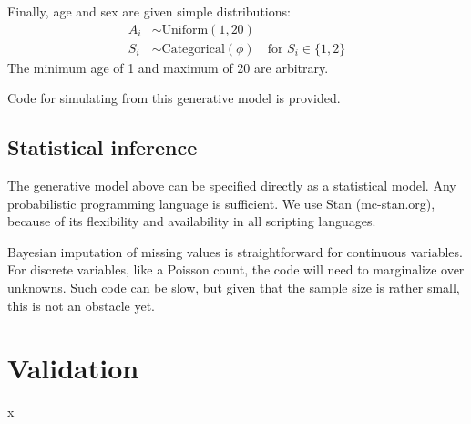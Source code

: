 \documentclass[reqno ,11pt]{amsart}
\begin{document}
Finally, age and sex are given simple distributions:
\begin{align*}
  A_i &\sim \text{Uniform}(1,20)\\
  S_i &\sim \text{Categorical}(\phi) \quad \text{for $S_i \in \{1,2\}$}
\end{align*}
The minimum age of 1 and maximum of 20 are arbitrary. 

Code for simulating from this generative model is provided.

\subsection{Statistical inference}

The generative model above can be specified directly as a statistical model. Any probabilistic programming language is sufficient. We use Stan (mc-stan.org), because of its flexibility and availability in all scripting languages.

Bayesian imputation of missing values is straightforward for continuous variables. For discrete variables, like a Poisson count, the code will need to marginalize over unknowns. Such code can be slow, but given that the sample size is rather small, this is not an obstacle yet.

\section{Validation}

x


\clearpage
 

\end{document}
